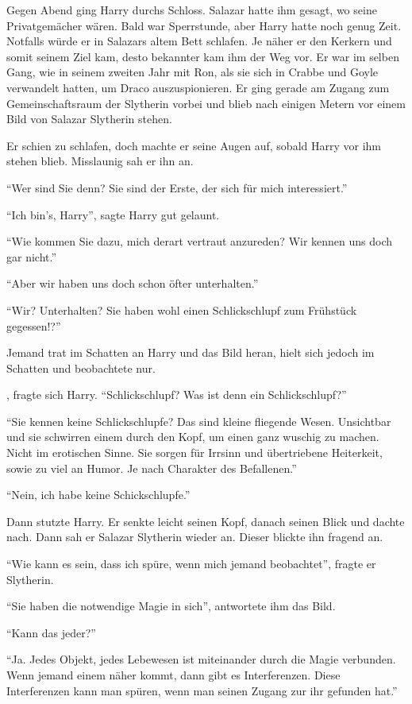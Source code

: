 Gegen Abend ging Harry durchs Schloss. Salazar hatte ihm gesagt, wo seine Privatgemächer wären. Bald war Sperrstunde, aber Harry hatte noch genug Zeit. Notfalls würde er in Salazars altem Bett schlafen. Je näher er den Kerkern und somit seinem Ziel kam, desto bekannter kam ihm der Weg vor. Er war im selben Gang, wie in seinem zweiten Jahr mit Ron, als sie sich in Crabbe und Goyle verwandelt hatten, um Draco auszuspionieren. Er ging gerade am Zugang zum Gemeinschaftsraum der Slytherin vorbei und blieb nach einigen Metern vor einem Bild von Salazar Slytherin stehen.

Er schien zu schlafen, doch machte er seine Augen auf, sobald Harry vor ihm stehen blieb. Misslaunig sah er ihn an.

\enquote{Wer sind Sie denn? Sie sind der Erste, der sich für mich interessiert.}

\enquote{Ich bin's, Harry}, sagte Harry gut gelaunt.

\enquote{Wie kommen Sie dazu, mich derart vertraut anzureden? Wir kennen uns doch gar nicht.}

\enquote{Aber wir haben uns doch schon öfter unterhalten.}

\enquote{Wir? Unterhalten? Sie haben wohl einen Schlickschlupf zum Frühstück gegessen!?}

Jemand trat im Schatten an Harry und das Bild heran, hielt sich jedoch im Schatten und beobachtete nur.

, fragte sich Harry. \enquote{Schlickschlupf? Was ist denn ein Schlickschlupf?}

\enquote{Sie kennen keine Schlickschlupfe? Das sind kleine fliegende Wesen. Unsichtbar und sie schwirren einem durch den Kopf, um einen ganz wuschig zu machen. Nicht im erotischen Sinne. Sie sorgen für Irrsinn und übertriebene Heiterkeit, sowie zu viel an Humor. Je nach Charakter des Befallenen.}

\enquote{Nein, ich habe keine Schickschlupfe.}

Dann stutzte Harry. Er senkte leicht seinen Kopf, danach seinen Blick und dachte nach. Dann sah er Salazar Slytherin wieder an. Dieser blickte ihn fragend an.

\enquote{Wie kann es sein, dass ich spüre, wenn mich jemand beobachtet}, fragte er Slytherin.

\enquote{Sie haben die notwendige Magie in sich}, antwortete ihm das Bild.

\enquote{Kann das jeder?}

\enquote{Ja. Jedes Objekt, jedes Lebewesen ist miteinander durch die Magie verbunden. Wenn jemand einem näher kommt, dann gibt es Interferenzen. Diese Interferenzen kann man spüren, wenn man seinen Zugang zur ihr gefunden hat.}


